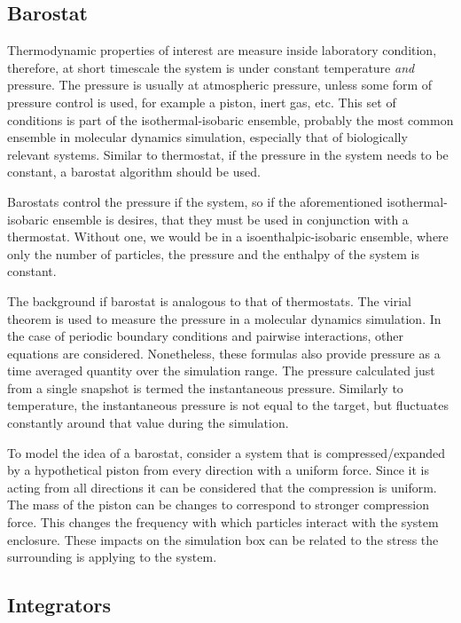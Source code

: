 \subsection{Barostat}

Thermodynamic properties of interest are measure inside laboratory condition, therefore, at short timescale the system is under constant temperature \emph{and} pressure. The pressure is usually at atmospheric pressure, unless some form of pressure control is used, for example a piston, inert gas, etc. This set of conditions is part of the isothermal-isobaric ensemble, probably the most common ensemble in molecular dynamics simulation, especially that of biologically relevant systems. Similar to thermostat, if the pressure in the system needs to be constant, a barostat algorithm should be used.

Barostats control the pressure if the system, so if the aforementioned isothermal-isobaric ensemble is desires, that they must be used in conjunction with a thermostat. Without one, we would be in a isoenthalpic-isobaric ensemble, where only the number of particles, the pressure and the enthalpy  of the system is constant.

The background if barostat is analogous to that of thermostats. The virial theorem is used to measure the pressure in a molecular dynamics simulation. In the case of periodic boundary conditions and pairwise interactions, other equations are considered. Nonetheless, these formulas also provide pressure as a time averaged quantity over the simulation range. The pressure calculated just from a single snapshot is termed the instantaneous pressure. Similarly to temperature, the instantaneous pressure is not equal to the target, but fluctuates constantly around that value during the simulation.

To model the idea of a barostat, consider a system that is compressed/expanded by a hypothetical piston from every direction with a uniform force. Since it is acting from all directions it can be considered that the compression is uniform. The mass of the piston can be changes to correspond to stronger compression force. This changes the frequency with which particles interact with the system enclosure. These impacts on the simulation box can be related to the stress the surrounding is applying to the system.

\subsection{Integrators}

